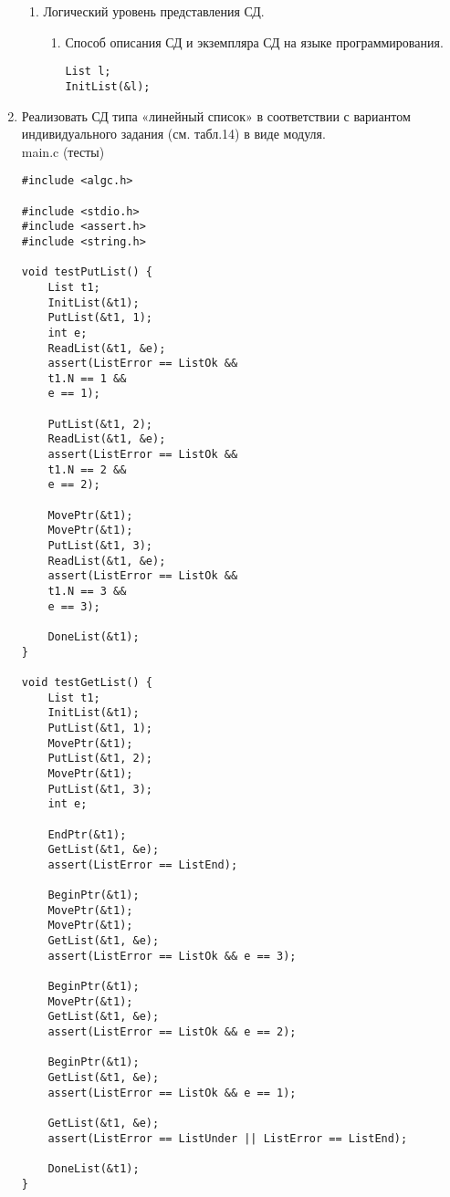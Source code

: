 \documentclass[a4paper,14pt]{extarticle}
\begin{document}
\begin{enumerate}
\begin{enumerate}[label*=\arabic*.]
		      \item Логический уровень представления СД.
		            \begin{enumerate}[label*=\arabic*.]
			            \item Способ описания СД и экземпляра СД на языке программирования.\\
						\begin{verbatim}
List l;
InitList(&l);
												  \end{verbatim}
		            \end{enumerate}
	      \end{enumerate}
		  \item Реализовать СД типа «линейный список» в соответствии с 
          вариантом индивидуального задания (см. табл.14) в виде модуля.\\
main.c (тесты)
		  \begin{verbatim}
#include <algc.h>

#include <stdio.h>
#include <assert.h>
#include <string.h>

void testPutList() {
    List t1;
    InitList(&t1);
    PutList(&t1, 1);
    int e;
    ReadList(&t1, &e);
    assert(ListError == ListOk && 
    t1.N == 1 && 
    e == 1);

    PutList(&t1, 2);
    ReadList(&t1, &e);
    assert(ListError == ListOk && 
    t1.N == 2 && 
    e == 2);

    MovePtr(&t1);
    MovePtr(&t1);
    PutList(&t1, 3);
    ReadList(&t1, &e);
    assert(ListError == ListOk && 
    t1.N == 3 && 
    e == 3);

    DoneList(&t1);
}

void testGetList() {
    List t1;
    InitList(&t1);
    PutList(&t1, 1);
    MovePtr(&t1);
    PutList(&t1, 2);
    MovePtr(&t1);
    PutList(&t1, 3);
    int e;

    EndPtr(&t1);
    GetList(&t1, &e);
    assert(ListError == ListEnd);

    BeginPtr(&t1);
    MovePtr(&t1);
    MovePtr(&t1);
    GetList(&t1, &e);
    assert(ListError == ListOk && e == 3);

    BeginPtr(&t1);
    MovePtr(&t1);
    GetList(&t1, &e);
    assert(ListError == ListOk && e == 2);

    BeginPtr(&t1);
    GetList(&t1, &e);
    assert(ListError == ListOk && e == 1);

    GetList(&t1, &e);
    assert(ListError == ListUnder || ListError == ListEnd);

    DoneList(&t1);
}


\end{verbatim}
\end{enumerate}
\end{document}
